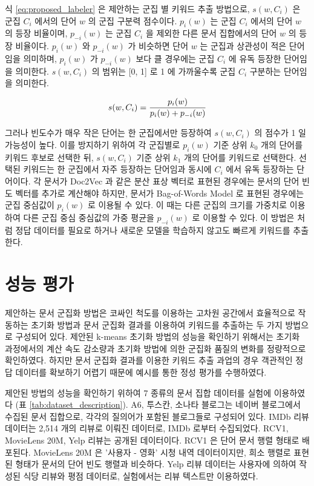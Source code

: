 \documentclass[oneside, ko,phd]{snuthesis_utf8_kor}
\begin{document}
식 \ref{eq:proposed_labeler} 은 제안하는 군집 별 키워드 추출 방법으로, $s(w, C_i)$ 은 군집 $C_i$ 에서의 단어 $w$ 의 군집 구분력 점수이다.
$p_i (w)$ 는 군집 $C_i$ 에서의 단어 $w$ 의 등장 비율이며, $p_{-i} (w)$ 는 군집 $C_i$ 을 제외한 다른 문서 집합에서의 단어 $w$ 의 등장 비율이다.
$p_i (w)$ 와 $p_{-i} (w)$ 가 비슷하면 단어 $w$ 는 군집과 상관성이 적은 단어임을 의미하며, $p_i (w)$ 가 $p_{-i} (w)$ 보다 클 경우에는 군집 $C_i$ 에 유독 등장한 단어임을 의미한다.
$s(w, C_i)$ 의 범위는 [0, 1] 로 1 에 가까울수록 군집 $C_i$ 구분하는 단어임을 의미한다.

\begin{equation}
\label{eq:proposed_labeler}
\centering
s(w, C_i) = \frac{p_i (w)}{p_i (w) + p_{-i}(w)}
\end{equation}

그러나 빈도수가 매우 작은 단어는 한 군집에서만 등장하여 $s(w, C_i)$ 의 점수가 1 일 가능성이 높다.
이를 방지하기 위하여 각 군집별로 $p_i (w)$ 기준 상위 $k_0$ 개의 단어를 키워드 후보로 선택한 뒤, $s(w, C_i)$ 기준 상위 $k_1$ 개의 단어를 키워드로 선택한다.
선택된 키워드는 한 군집에서 자주 등장하는 단어임과 동시에 $C_i$ 에서 유독 등장하는 단어이다.
각 문서가 Doc2Vec 과 같은 분산 표상 벡터로 표현된 경우에는 문서의 단어 빈도 벡터를 추가로 계산해야 하지만, 문서가 Bag-of-Words Model 로 표현된 경우에는 군집 중심값이 $p_i (w)$ 로 이용될 수 있다.
이 때는 다른 군집의 크기를 가중치로 이용하여 다른 군집 중심 중심값의 가중 평균을 $p_{-i}(w)$ 로 이용할 수 있다.
이 방법은 \cite{zhang2006keyword, onan2016ensemble} 처럼 정답 데이터를 필요로 하거나 새로운 모델을 학습하지 않고도 빠르게 키워드를 추출한다.


\section{성능 평가}

제안하는 문서 군집화 방법은 코싸인 척도를 이용하는 고차원 공간에서 효율적으로 작동하는 초기화 방법과 문서 군집화 결과를 이용하여 키워드를 추출하는 두 가지 방법으로 구성되어 있다.
제안된 k-means 초기화 방법의 성능을 확인하기 위해서는 초기화 과정에서의 계산 속도 감소량과 초기화 방법에 의한 군집화 품질의 변화를 정량적으로 확인하였다.
하지만 문서 군집화 결과를 이용한 키워드 추출 과업의 경우 객관적인 정답 데이터를 확보하기 어렵기 때문에 예시를 통한 정성 평가를 수행하였다.

제안된 방법의 성능을 확인하기 위하여 7 종류의 문서 집합 데이터를 실험에 이용하였다 (표 \ref{tab:dataset_description}).
A6, 투스칸, 소나타 블로그는 네이버 블로그에서 수집된 문서 집합으로, 각각의 질의어가 포함된 블로그들로 구성되어 있다.
IMDb 리뷰 데이터는 2,514 개의 리뷰로 이뤄진 데이터로, IMDb 로부터 수집되었다.
RCV1, MovieLens 20M, Yelp 리뷰는 공개된 데이터이다.
RCV1 은 단어 문서 행렬 형태로 배포된다.
MovieLens 20M 은 '사용자 - 영화' 시청 내역 데이터이지만, 희소 행렬로 표현된 형태가 문서의 단어 빈도 행렬과 비슷하다.
Yelp 리뷰 데이터는 사용자에 의하여 작성된 식당 리뷰와 평점 데이터로, 실험에서는 리뷰 텍스트만 이용하였다.
\end{document}
